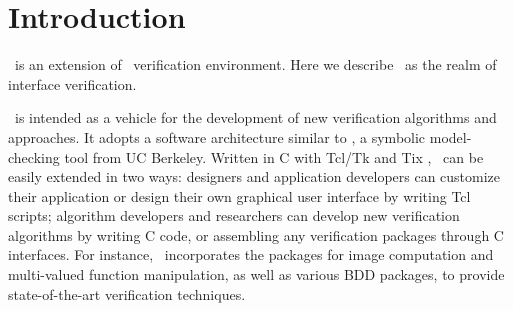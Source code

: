 \chapter{Introduction}
\chai\ is an extension of \mocha\ verification environment.
Here we describe \chai\ as the realm of interface verification.

\chai\ is intended as a vehicle for the development of new
verification algorithms and approaches.  It adopts a software
architecture similar to \vis \cite{BHS96}, a symbolic model-checking
tool from UC Berkeley.  Written in C with Tcl/Tk and Tix
\cite{tix-http}, \chai\ can be easily extended in two ways: designers
and application developers can customize their application or design
their own graphical user interface by writing Tcl scripts; algorithm
developers and researchers can develop new verification algorithms by
writing C code, or assembling any verification packages through C
interfaces.  For instance, \chai\ incorporates the \vis packages
for image computation and multi-valued function manipulation, as well
as various BDD packages, to provide state-of-the-art verification
techniques.
